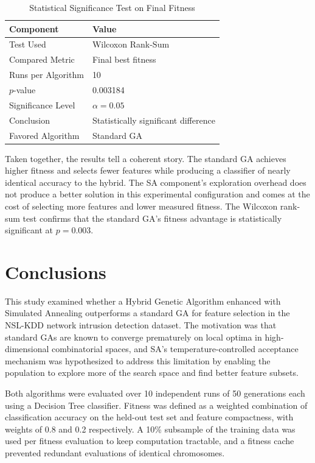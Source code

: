 \documentclass[letterpaper]{article} %
\begin{document}
\begin{table}[t]
\centering
\caption{Statistical Significance Test on Final Fitness}
\label{tab:wilcoxon}
\begin{tabular}{ll}
\toprule
\textbf{Component} & \textbf{Value} \\
\midrule
Test Used          & Wilcoxon Rank-Sum\\
Compared Metric    & Final best fitness \\
Runs per Algorithm & 10 \\
$p$-value          & 0.003184 \\
Significance Level & $\alpha = 0.05$ \\
Conclusion         & Statistically significant difference \\
Favored Algorithm  & Standard GA \\
\bottomrule
\end{tabular}
\end{table}

Taken together, the results tell a coherent story. The standard GA achieves higher fitness and selects fewer features while producing a classifier of nearly identical accuracy to the hybrid. The SA component's exploration overhead does not produce a better solution in this experimental configuration and comes at the cost of selecting more features and lower measured fitness. The Wilcoxon rank-sum test confirms that the standard GA's fitness advantage is statistically significant at $p = 0.003$.

\section{Conclusions}

This study examined whether a Hybrid Genetic Algorithm enhanced with Simulated Annealing outperforms a standard GA for feature selection in the NSL-KDD network intrusion detection dataset. The motivation was that standard GAs are known to converge prematurely on local optima in high-dimensional combinatorial spaces, and SA's temperature-controlled acceptance mechanism was hypothesized to address this limitation by enabling the population to explore more of the search space and find better feature subsets.

Both algorithms were evaluated over 10 independent runs of 50 generations each using a Decision Tree classifier. Fitness was defined as a weighted combination of classification accuracy on the held-out test set and feature compactness, with weights of 0.8 and 0.2 respectively. A 10\% subsample of the training data was used per fitness evaluation to keep computation tractable, and a fitness cache prevented redundant evaluations of identical chromosomes.
\end{document}
